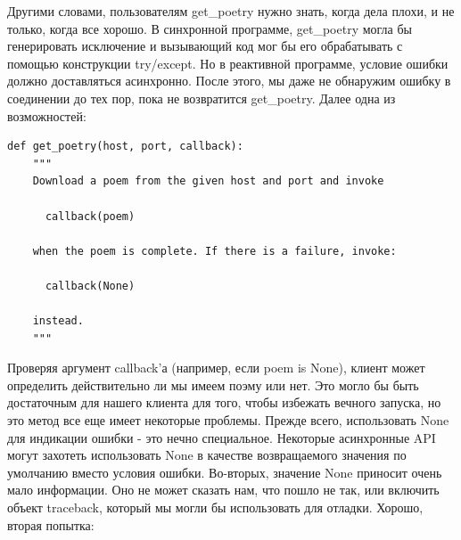 
Другими словами, пользователям get\_poetry нужно 
знать, когда дела плохи, и не только, когда все хорошо. 
В синхронной программе, get\_poetry могла бы генерировать 
исключение и вызывающий код мог бы его обрабатывать с 
помощью конструкции try/except. Но в реактивной программе, 
условие ошибки должно доставляться асинхронно. После этого, 
мы даже не обнаружим ошибку в соединении до тех пор, пока 
не возвратится get\_poetry. Далее одна из возможностей:

\begin{scriptsize}\begin{verbatim}
def get_poetry(host, port, callback):
    """
    Download a poem from the given host and port and invoke

      callback(poem)

    when the poem is complete. If there is a failure, invoke:

      callback(None)

    instead.
    """
\end{verbatim}\end{scriptsize}


Проверяя аргумент callback'а (например, если poem is None), 
клиент может определить действительно ли мы имеем поэму или нет. 
Это могло бы быть достаточным для нашего клиента для того, чтобы 
избежать вечного запуска, но это метод все еще имеет 
некоторые проблемы. Прежде всего, использовать None для индикации 
ошибки - это нечно специальное. Некоторые асинхронные API могут 
захотеть использовать None в качестве возвращаемого 
значения по умолчанию вместо условия ошибки. Во-вторых, значение None 
приносит очень мало информации. Оно не может сказать нам, что пошло 
не так, или включить объект traceback, который мы могли бы 
использовать для отладки. Хорошо, вторая попытка:

